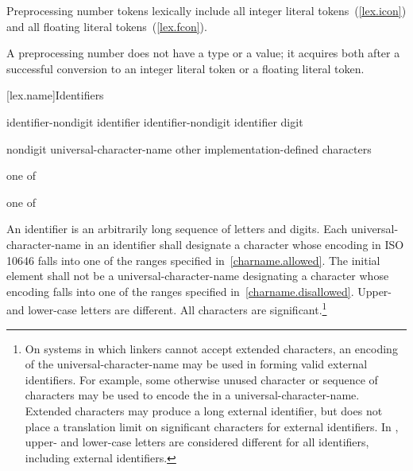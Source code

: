 \pnum
Preprocessing number tokens lexically include all integer literal
tokens~(\ref{lex.icon}) and all floating literal
tokens~(\ref{lex.fcon}).

\pnum
A preprocessing number does not have a type or a value; it acquires both
after a successful conversion to an integer literal token or a floating literal
token.%

[lex.name]{Identifiers}

%
\begin{bnf}
\br
    identifier-nondigit\br
    identifier identifier-nondigit\br
    identifier digit
\end{bnf}

\begin{bnf}
\br
    nondigit\br
    universal-character-name\br
    \textnormal{other implementation-defined characters}
\end{bnf}

\begin{bnf}
 \textnormal{one of}\br
    \br
    \br
    \br
\end{bnf}

\begin{bnf}
 \textnormal{one of}\br
\end{bnf}

\pnum
{}%
%
An identifier is an arbitrarily long sequence of letters and digits.
Each universal-character-name in an identifier shall designate a
character whose encoding in ISO 10646 falls into one of the ranges
specified in~\ref{charname.allowed}.
The initial element shall not be a universal-character-name
designating a character whose encoding falls into one of the ranges
specified in~\ref{charname.disallowed}.
Upper- and lower-case letters are
different. All characters are significant.\footnote{On systems in which linkers cannot accept extended
characters, an encoding of the universal-character-name may be used in
forming valid external identifiers. For example, some otherwise unused
character or sequence of characters may be used to encode the
 in a universal-character-name. Extended
characters may produce a long external identifier, but \Cpp does not
place a translation limit on significant characters for external
identifiers. In \Cpp, upper- and lower-case letters are considered
different for all identifiers, including external identifiers. }

